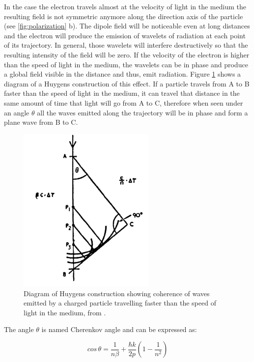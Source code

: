 \documentclass[main.tex]{subfiles}
\begin{document}
In the case the electron travels almost at the velocity of light in the medium the resulting field is not symmetric anymore along the direction axis of the particle (see \ref{fig:polarization} b). The dipole field will be noticeable even at long distances and the electron will produce the emission of wavelets of radiation at each point of its trajectory. In general, those wavelets will interfere destructively so that the resulting intensity of the field will be zero. If the velocity of the electron is higher than the speed of light in the medium, the wavelets can be in phase and produce a global field visible in the distance and thus, emit radiation. Figure \ref{fig:huygens} shows a diagram of a Huygens construction of this effect. If a particle travels from A to B faster than the speed of light in the medium, it can travel that distance in the same amount of time that light will go from A to C, therefore when seen under an angle $\theta$ all the waves emitted along the trajectory will be in phase and form a plane wave from B to C. 

\begin{figure}[h]
    \centering
    \includegraphics[width=0.6\textwidth]{Pictures/huygenscoherence.pdf}
    \caption{Diagram of Huygens construction showing coherence of waves emitted by a charged particle travelling faster than the speed of light in the medium, from \cite{jelley1958Cherenkov}.}
    \label{fig:huygens}
\end{figure}

The angle $\theta$ is named Cherenkov angle and can be expressed as:

\begin{equation}
    cos\,\theta = \frac{1}{n\beta} + \frac{\hbar k}{2p} \left( 1-\frac{1}{n^2}\right)
\end{equation}
\end{document}

